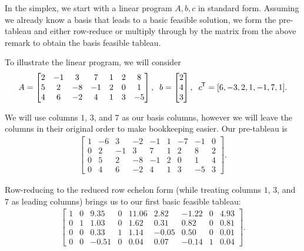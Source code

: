 In the simplex, we start with a linear program $A, b, c$ in standard form. Assuming we already know a basis that leads to a basic feasible solution, we form the pre-tableau and either row-reduce or multiply through by the matrix from the above remark to obtain the basis feasible tableau.

To illustrate the linear program, we will consider
\begin{align*}
    A =
    \begin{bmatrix}
        2 & -1 & 3 & 7 & 1 & 2 & 8 \\
        5 & 2 & -8 & -1 & 2 & 0 & 1 \\
        4 & 6 & -2 & 4 & 1 & 3 & -5
    \end{bmatrix},\;\;
    b = \begin{bmatrix}
        2 \\ 4 \\ 3
    \end{bmatrix},\;\;
    {c}^{\mkern-1.5mu\mathsf{T}} = [6, -3, 2, 1, -1, 7, 1].
\end{align*}

We will use columns $1$, $3$, and $7$ as our basis columns, however we will leave the columns in their original order to make bookkeeping easier. Our pre-tableau is
\begin{align*}
    \left[\begin{array}{c|ccccccc|c}
        1 & -6 & 3 & -2 & -1 & 1 & -7 & -1 & 0 \\
        \hline
        0 & 2 & -1 & 3 & 7 & 1 & 2 & 8 & 2 \\
        0 & 5 & 2 & -8 & -1 & 2 & 0 & 1 & 4 \\
        0 & 4 & 6 & -2 & 4 & 1 & 3 & -5 & 3
    \end{array}\right].
\end{align*}

Row-reducing to the reduced row echelon form (while treating columns $1$, $3$, and $7$ as leading columns) brings us to our first basic feasible tableau:
\begin{align*}
    \left[\begin{array}{c|ccccccc|c}
        1 & 0 & 9.35 & 0 & 11.06 & 2.82 & -1.22 & 0 & 4.93 \\
        \hline
        0 & 1 & 1.03 & 0 & 1.62 & 0.31 & 0.82 & 0 & 0.81 \\
        0 & 0 & 0.33 & 1 & 1.14 & -0.05 & 0.50 & 0 & 0.01 \\
        0 & 0 & -0.51 & 0 & 0.04 & 0.07 & -0.14 & 1 & 0.04
    \end{array}\right].
\end{align*}

